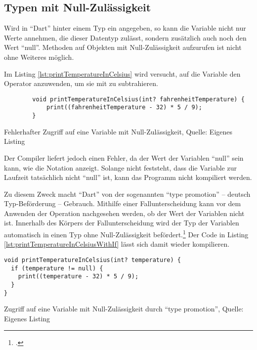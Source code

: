\subsection{Typen mit Null-Zulässigkeit}
\label{sec:TypenMitNullZulaessigkeit}

Wird in \enquote{Dart} hinter einem Typ ein  angegeben, 
so kann die Variable nicht nur  Werte annehmen, die dieser Datentyp zulässt,
sondern zusätzlich auch noch den Wert \enquote{null}.
Methoden auf Objekten mit Null-Zulässigkeit aufzurufen ist nicht ohne Weiteres möglich.

Im Listing \ref{lst:printTemperatureInCelsius}
wird versucht, auf die Variable  den Operator \IC{-} anzuwenden, um sie mit  zu subtrahieren.


\ifIncludeFigures
  \begin{listing}[ht]
    \begin{verbatim}
        void printTemperatureInCelsius(int? fahrenheitTemperature) {
            print((fahrenheitTemperature - 32) * 5 / 9);
        }
\end{verbatim}
    \caption[Fehlerhafter Zugriff auf eine Variable mit Null-Zulässigkeit]{Fehlerhafter Zugriff auf eine Variable mit Null-Zulässigkeit, Quelle: Eigenes Listing}
    \label{lst:printTemperatureInCelsius}
  \end{listing}
\fi

Der Compiler liefert jedoch einen Fehler, da der Wert der Variablen \enquote{null} sein kann, wie die Notation  anzeigt.
Solange nicht feststeht, dass die Variable zur Laufzeit tatsächlich nicht \enquote{null} ist, kann das Programm nicht kompiliert werden.


Zu diesem Zweck macht \enquote{Dart} von der sogenannten \enquote{type promotion} -- deutsch Typ-Beförderung -- Gebrauch.
Mithilfe einer Fallunterscheidung kann vor dem Anwenden der Operation nachgesehen werden, ob der Wert der Variablen nicht  ist.
Innerhalb des Körpers der Fallunterscheidung wird der Typ der Variablen automatisch in einen Typ ohne Null-Zulässigkeit befördert.\footcite[Vgl.][]{TypePromotionOnNullChecks}
Der Code in Listing \ref{lst:printTemperatureInCelsiusWithIf} lässt sich damit wieder kompilieren.

\ifIncludeFigures
  \begin{listing}[ht]
    \begin{verbatim}
void printTemperatureInCelsius(int? temperature) {
  if (temperature != null) {
    print((temperature - 32) * 5 / 9);
  }
}
\end{verbatim}
    \caption[Zugriff auf eine Variable mit Null-Zulässigkeit durch \enquote{type promotion}]{Zugriff auf eine Variable mit Null-Zulässigkeit durch \enquote{type promotion}, Quelle: Eigenes Listing}
    \label{lst:printTemperatureInCelsiusWithIf}
  \end{listing}
\fi


